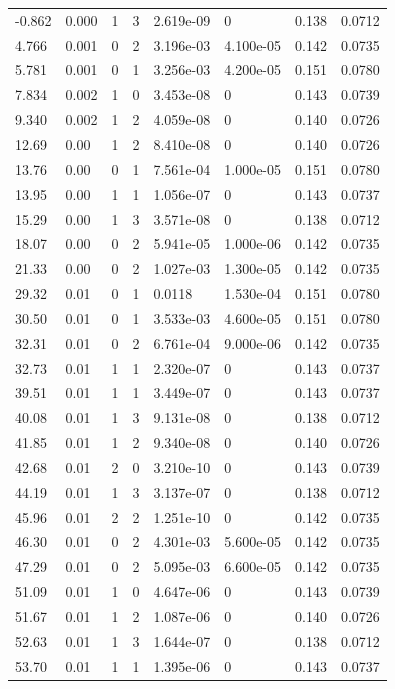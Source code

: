 \documentclass[preview]{standalone}
\begin{document}
{{\begin{tabular}{L{1.2cm}C{1.2cm} C{0.3cm}C{0.5cm} C{1.4cm}C{1.4cm} C{1.4cm}C{1.4cm}}
  -0.862  &  0.000  & 1     &  3 &  2.619e-09  & 0  & 0.138 &  0.0712   \\ 
  4.766  &  0.001  & 0     &  2 &  3.196e-03  & 4.100e-05  & 0.142 &  0.0735   \\ 
  5.781  &  0.001  & 0     &  1 &  3.256e-03  & 4.200e-05  & 0.151 &  0.0780   \\ 
  7.834  &  0.002  & 1     &  0 &  3.453e-08  & 0  & 0.143 &  0.0739   \\ 
  9.340  &  0.002  & 1     &  2 &  4.059e-08  & 0  & 0.140 &  0.0726   \\ 
  12.69  &  0.00  & 1     &  2 &  8.410e-08  & 0  & 0.140 &  0.0726   \\ 
  13.76  &  0.00  & 0     &  1 &  7.561e-04  & 1.000e-05  & 0.151 &  0.0780   \\ 
  13.95  &  0.00  & 1     &  1 &  1.056e-07  & 0  & 0.143 &  0.0737   \\ 
  15.29  &  0.00  & 1     &  3 &  3.571e-08  & 0  & 0.138 &  0.0712   \\ 
  18.07  &  0.00  & 0     &  2 &  5.941e-05  & 1.000e-06  & 0.142 &  0.0735   \\ 
  21.33  &  0.00  & 0     &  2 &  1.027e-03  & 1.300e-05  & 0.142 &  0.0735   \\ 
  29.32  &  0.01  & 0     &  1 &  0.0118  & 1.530e-04  & 0.151 &  0.0780   \\ 
  30.50  &  0.01  & 0     &  1 &  3.533e-03  & 4.600e-05  & 0.151 &  0.0780   \\ 
  32.31  &  0.01  & 0     &  2 &  6.761e-04  & 9.000e-06  & 0.142 &  0.0735   \\ 
  32.73  &  0.01  & 1     &  1 &  2.320e-07  & 0  & 0.143 &  0.0737   \\ 
  39.51  &  0.01  & 1     &  1 &  3.449e-07  & 0  & 0.143 &  0.0737   \\ 
  40.08  &  0.01  & 1     &  3 &  9.131e-08  & 0  & 0.138 &  0.0712   \\ 
  41.85  &  0.01  & 1     &  2 &  9.340e-08  & 0  & 0.140 &  0.0726   \\ 
  42.68  &  0.01  & 2     &  0 &  3.210e-10  & 0  & 0.143 &  0.0739   \\ 
  44.19  &  0.01  & 1     &  3 &  3.137e-07  & 0  & 0.138 &  0.0712   \\ 
  45.96  &  0.01  & 2     &  2 &  1.251e-10  & 0  & 0.142 &  0.0735   \\ 
  46.30  &  0.01  & 0     &  2 &  4.301e-03  & 5.600e-05  & 0.142 &  0.0735   \\ 
  47.29  &  0.01  & 0     &  2 &  5.095e-03  & 6.600e-05  & 0.142 &  0.0735   \\ 
  51.09  &  0.01  & 1     &  0 &  4.647e-06  & 0  & 0.143 &  0.0739   \\ 
  51.67  &  0.01  & 1     &  2 &  1.087e-06  & 0  & 0.140 &  0.0726   \\ 
  52.63  &  0.01  & 1     &  3 &  1.644e-07  & 0  & 0.138 &  0.0712   \\ 
  53.70  &  0.01  & 1     &  1 &  1.395e-06  & 0  & 0.143 &  0.0737   \\ 
\hline 
\end{tabular} 

}}
\end{document}
